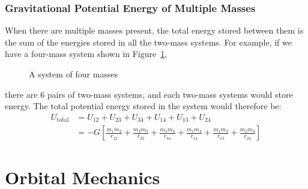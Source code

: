 \subsection{Gravitational Potential Energy of Multiple Masses}
When there are multiple masses present, the total energy stored between them is
the sum of the energies stored in all the two-mass systems. For example, if we
have a four-mass system shown in Figure~\ref{fig:4-mass-system},
\begin{figure}[ht]
  \centering
  \caption{A system of four masses}
  \label{fig:4-mass-system}
\end{figure}
there are 6 pairs of two-mass systems, and each two-mass systems would store
energy. The total potential energy stored in the system would therefore be:
\begin{align*}
  U_\text{total} &=U_{12}+U_{23}+U_{34}+U_{14}+U_{13}+U_{24}\\
  &=-G
  \left[\frac{m_1m_2}{r_{12}}
    +\frac{m_2m_3}{r_{23}}
    +\frac{m_3m_4}{r_{34}}
    +\frac{m_1m_4}{r_{14}}
    +\frac{m_1m_3}{r_{13}}
    +\frac{m_2m_4}{r_{24}}\right]
\end{align*}






\chapter{Orbital Mechanics}

